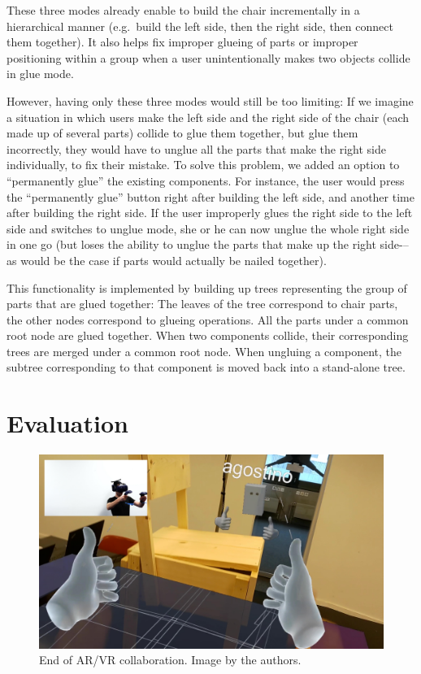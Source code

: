 \documentclass[10pt,twocolumn,letterpaper,english]{article}
\begin{document}
These three modes already enable to build the chair incrementally in a hierarchical manner (e.g.\ build the left side, then the right side, then connect them together). It also helps fix improper glueing of parts or improper positioning within a group when a user unintentionally makes two objects collide in glue mode.

However, having only these three modes would still be too limiting: If we imagine a situation in which users make the left side and the right side of the chair (each made up of several parts) collide to glue them together, but glue them incorrectly, they would have to unglue all the parts that make the right side individually, to fix their mistake. To solve this problem, we added an option to ``permanently glue'' the existing components. For instance, the user would press the ``permanently glue'' button right after building the left side, and another time after building the right side. If the user improperly glues the right side to the left side and switches to unglue mode, she or he can now unglue the whole right side in one go (but loses the ability to unglue the parts that make up the right side-–as would be the case if parts would actually be nailed together).

This functionality is implemented by building up trees representing the group of parts that are glued together: The leaves of the tree correspond to chair parts, the other nodes correspond to glueing operations. All the parts under a common root node are glued together. When two components collide, their corresponding trees are merged under a common root node. When ungluing a component, the subtree corresponding to that component is moved back into a stand-alone tree.

\section{Evaluation}

\begin{figure}[!htp]
    \centering
    \includegraphics[width=1\linewidth]{Finished.jpg}
    \caption{End of AR/VR collaboration. Image by the authors.}
    \label{fig:Finished}
\end{figure}
\end{document}
